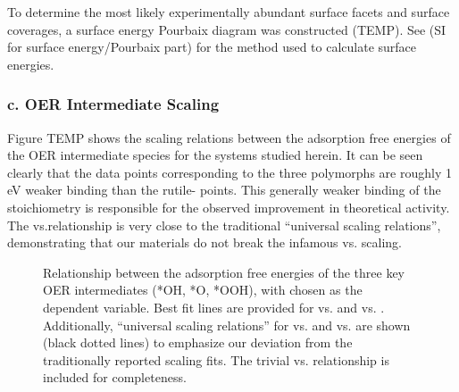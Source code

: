 To determine the most likely experimentally abundant surface facets and surface coverages, a surface energy Pourbaix diagram was constructed (TEMP).  %
See (SI for surface energy/Pourbaix part) for the method used to calculate surface energies.

\subsubsection{c. OER Intermediate Scaling}

Figure TEMP shows the scaling relations between the adsorption free energies of the OER intermediate species for the \IrOx systems studied herein.
It can be seen clearly that the data points corresponding to the three  polymorphs are roughly 1 eV weaker binding than the rutile- points.
This generally weaker binding of the  stoichiometry is responsible for the observed improvement in theoretical activity.
The \DGOOH vs.\DGOH relationship is very close to the traditional ``universal scaling relations'', demonstrating that our materials do not break the infamous \DGOOH vs. \DGOH scaling.

\begin{figure}
\centering
{}
\caption{\label{fig:scaling_relations}
Relationship between the adsorption free energies of the three key OER intermediates (*OH, *O, *OOH), with \DGOH chosen as the dependent variable.
Best fit lines are provided for \DGOOH vs. \DGOH and \DGO vs. \DGOH.
Additionally, ``universal scaling relations'' for \DGOOH vs. \DGOH and \DGO vs. \DGOH are shown (black dotted lines) to emphasize our deviation from the traditionally reported scaling fits.
The trivial \DGOH vs. \DGOH relationship is included for completeness.
}
\end{figure}

